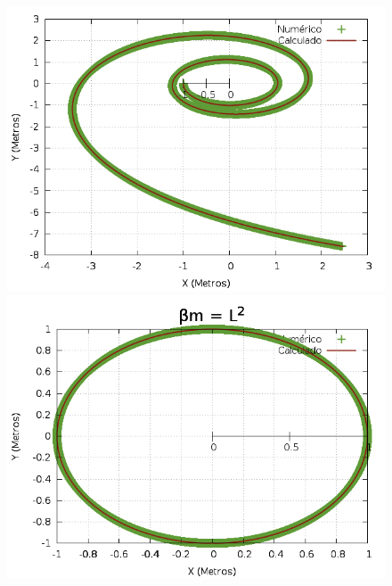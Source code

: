 \documentclass[a4paper,12pt]{exam}
\begin{document}
\begin{figure}[l]
			\includegraphics[scale=0.3]{3o2.png}
			\includegraphics[scale=0.3]{3o3.png}
			
		\end{figure}
	
\end{document}
